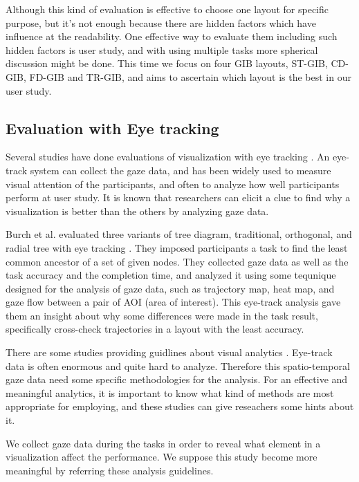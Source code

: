 \documentclass{vgtc}                          %
\begin{document}
Although this kind of evaluation is effective to choose one layout for specific purpose, but it's not enough because there are hidden factors which have influence at the readability. One effective way to evaluate them including such hidden factors is user study, and with using multiple tasks more spherical discussion might be done. This time we focus on four GIB layouts, ST-GIB, CD-GIB, FD-GIB and TR-GIB, and aims to ascertain which layout is the best in our user study.

\subsection{Evaluation with Eye tracking}
Several studies have done evaluations of visualization with eye tracking \cite{burch2011evaluation,pohl2009comparing,netzel2014comparative,jianu2014display,7539393}. An eye-track system can collect the gaze data, and has been widely used to measure visual attention of the participants, and often to analyze how well participants perform at user study. It is known that researchers can elicit a clue to find why a visualization is better than the others by analyzing gaze data.

Burch et al. evaluated three variants of tree diagram, traditional, orthogonal, and radial tree with eye tracking \cite{burch2011evaluation}. They imposed participants a task to find the least common ancestor of a set of given nodes. They collected gaze data as well as the task accuracy and the completion time, and analyzed it using some tequnique designed for the analysis of gaze data, such as trajectory map, heat map, and gaze flow between a pair of AOI (area of interest). This eye-track analysis gave them an insight about why some differences were made in the task result, specifically cross-check trajectories in a layout with the least accuracy.

There are some studies providing guidlines about visual analytics \cite{andrienko2012visual,kurzhals2014evaluating,duchowski2007eye}.
Eye-track data is often enormous and quite hard to analyze. Therefore this spatio-temporal gaze data need some specific methodologies for the analysis.
For an effective and meaningful analytics, it is important to know what kind of methods are most appropriate for employing, and these studies can give reseachers some hints about it.

We collect gaze data during the tasks in order to reveal what element in a visualization affect the performance. We suppose this study become more meaningful by referring these analysis guidelines.
\end{document}
